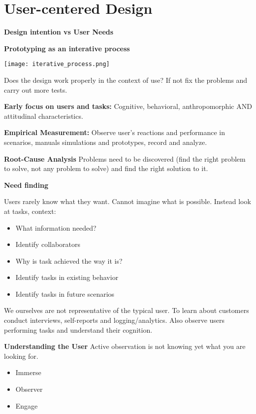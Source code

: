 \section{User-centered Design}


\textbf{Design intention vs User Needs}

\textbf{Prototyping as an interative process}

\begin{center}
	\texttt{[image: iterative\_process.png]}
\end{center}
Does the design work properly in the context of use? If not fix the problems and carry out more tests. \medskip

\textbf{Early focus on users and tasks:} Cognitive, behavioral, anthropomorphic AND attitudinal characteristics. \medskip

\textbf{Empirical Measurement:} Observe user's reactions and performance in scenarios, manuals simulations and prototypes, record and analyze. \medskip

\textbf{Root-Cause Analysis}
Problems need to be discovered (find the right problem to solve, not any problem to solve) and find the right solution to it. \medskip

\textbf{Need finding}

Users rarely know what they want. Cannot imagine what is possible. Instead look at tasks, context: 

\begin{multicols}{2}
    \begin{itemize}[itemsep=-5pt, topsep=-20pt, leftmargin=*]
	\item What information needed?
	\item Identify collaborators
	\item Why is task achieved the way it is?
	\item Identify tasks in existing behavior
	\item Identify tasks in future scenarios
	\end{itemize}
\end{multicols}

We ourselves are not representative of the typical user. To learn about customers conduct interviews, self-reports and logging/analytics.
Also observe users performing tasks and understand their cognition. \medskip

\textbf{Understanding the User}
Active observation is not knowing yet what you are looking for. 

\begin{multicols}{2}
    \begin{itemize}[itemsep=-5pt, topsep=-20pt, leftmargin=*]
	\item Immerse
	\item Observer
	\item Engage

	\end{itemize}
\end{multicols}


